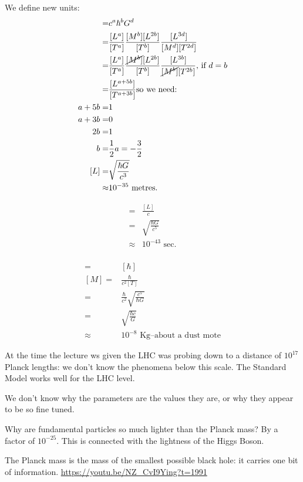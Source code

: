 \documentclass[]{article}
\begin{document}
 We define new units:
 \begin{align*}
 	[L] =& c^a \hbar^b G^d\\
 	=& \frac{[L^a]}{[T^a]} \frac{[M^b][L^{2b}]}{[T^b]} \frac{[L^{3d}]}{[M^d][T^{2d}]}\\
 	=& \frac{[L^a]}{[T^a]} \frac{\cancel{[M^b]}[L^{2b}]}{[T^b]} \frac{[L^{3b}]}{\cancel{[M^b]}[T^{2b}]} \text{, if $d=b$}\\
 	=& \frac{[L^{a+5b}]}{[T^{a+3b}]} \text{so we need:}\\
 	a+5b =& 1\\
 	a+3b =& 0\\
 	2b =& 1\\
 	b =& \frac{1}{2}
 	a=-\frac{3}{2}\\
 	[L] =& \sqrt{\frac{\hbar G}{c^3}}\\
 	\approx& 10^{-35} \text{ metres.}
 \end{align*}
 
 \begin{align*}
 	[T] =& \frac{[L]}{c}\\
 	=& \sqrt{\frac{\hbar G}{c^5}}\\ 
 	\approx & 10^{-43} \text{ sec.}\\
 \end{align*}
 
 \begin{align*}
 	[M][c^2] [T] =& [\hbar]\\
 	[M] =& \frac{\hbar}{c^2 [T]}\\
 	=& \frac{\hbar}{c^2} \sqrt{\frac{c^5}{\hbar G}}\\
 	=& \sqrt{\frac{\hbar c}{G}}\\
 	\approx & 10^{-8} \text{ Kg--about a dust mote}
 \end{align*}

At the time the lecture ws given the LHC was probing down to a distance of $10^17$ Planck lengths: we don't know the phenomena below this scale. The Standard Model works well for the LHC level.

We don't know why the parameters are the values they are, or why they appear to be so fine tuned.

Why are fundamental particles so much lighter than the Planck mass? By a factor of $10^{-25}$. This is connected with the lightness of the Higgs Boson.

The Planck mass is the mass of the smallest possible black hole: it carries one bit of information.
\url{https://youtu.be/NZ_CvI9Ying?t=1991}
\end{document}
